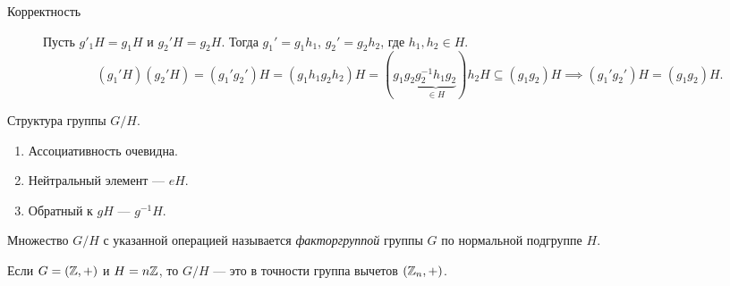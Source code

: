 \begin{description}
\item[Корректность] 
    Пусть $g'_1 H = g_1 H$ и $g_2' H = g_2 H$. 
    Тогда $g_1' = g_1 h_1$, $g_2' = g_2 h_2$, где $h_1, h_2 \in H$.
    \begin{equation*}
        (g_1'H)(g_2' H) = (g_1' g_2')H = (g_1 h_1 g_2 h_2) H = (g_1 g_2 \underbrace{g_2^{-1} h_1 g_2}_{\in H}) h_2 H \subseteq (g_1 g_2) H \implies (g_1' g_2') H = (g_1 g_2) H
    .\end{equation*}
\end{description}

Структура группы $G / H$.
\begin{enumerate}[nosep]
\item Ассоциативность очевидна.
\item Нейтральный элемент --- $eH$.
\item Обратный к $gH$ --- $g^{-1}H$.
\end{enumerate}

\begin{definition}
    Множество $G / H$ с указанной операцией называется \textit{факторгруппой} группы $G$ по нормальной подгруппе $H$.
\end{definition}

\begin{example}
    Если $G = (\mathbb{Z}, +)$ и $H = n\mathbb{Z}$, то $G / H$ --- это в точности группа вычетов $(\mathbb{Z}_n, +)$.
\end{example}
